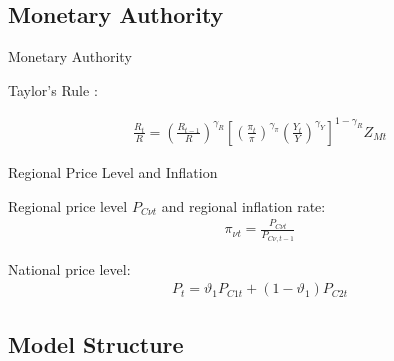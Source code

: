 \documentclass[../quali_slides.tex]{subfiles}
\begin{document}

\subsection{Monetary Authority}

\begin{frame}{Monetary Authority}
	
	Taylor's Rule \cite{taylor_discretion_1993}:
	
	\begin{align}
		\frac{R_t}{R} =
		\left( \frac{R_{t-1}}{R} \right)^{\gamma_R}  \left[
		\left( \frac{\pi_t}{\pi} \right)^{\gamma_\pi}
		\left( \frac{Y_t}{Y} \right)^{\gamma_Y} \right]^{1-\gamma_R} Z_{Mt}
	\end{align}	
	
	
\end{frame}


\begin{frame}{Regional Price Level and Inflation}
	
	Regional price level $P_{C\nu t}$ and regional inflation rate:
	\begin{align}
		\pi_{\nu t} = \frac{P_{C\nu t}}{P_{C\nu, t-1}} \label{eq:regional-inflation}
	\end{align}
	
	National price level:
	\begin{align}
		P_t = \vartheta_1 P_{C1 t} + (1 -\vartheta_1) P_{C2 t}
		\label{eq:national-price-level}
	\end{align}
	
	
	
\end{frame}


\subsection{Model Structure}
\end{document}
